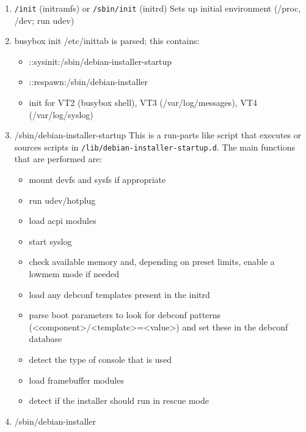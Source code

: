 \documentclass[a4paper,10pt]{article}
\begin{document}
\begin{enumerate}
\item
  \begin{flushleft}
\texttt{/init} (initramfs) or \texttt{/sbin/init} (initrd) \linebreak
Sets up initial environment (/proc, /dev; run udev)
  \end{flushleft}
\item
  \begin{flushleft}
busybox init \linebreak
/etc/inittab is parsed; this contains:
  \end{flushleft}
  \begin{itemize}
\item ::sysinit:/sbin/debian-installer-startup
\item ::respawn:/sbin/debian-installer
\item init for VT2 (busybox shell), VT3 (/var/log/messages), VT4 (/var/log/syslog)
  \end{itemize}
\item
  \begin{flushleft}
/sbin/debian-installer-startup \linebreak
This is a run-parts like script that executes or sources scripts in \texttt{/lib/debian-installer-startup.d}. The main functions that are performed are:
  \end{flushleft}
  \begin{itemize}
\item mount devfs and sysfs if appropriate
\item run udev/hotplug
\item load acpi modules 
\item start syslog 
\item check available memory and, depending on preset limits, enable a lowmem mode if needed 
\item load any debconf templates present in the initrd 
\item parse boot parameters to look for debconf patterns (<component>/<template>=<value>) and set these in the debconf database
\item detect the type of console that is used
\item load framebuffer modules
\item detect if the installer should run in rescue mode
  \end{itemize}
\item
  \begin{flushleft}
/sbin/debian-installer \linebreak

\end{flushleft}
\end{enumerate}
\end{document}
